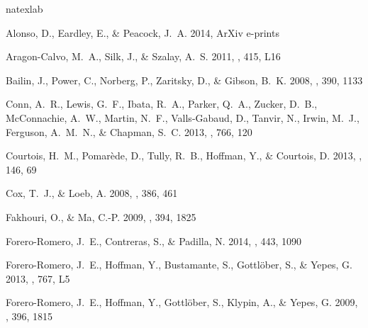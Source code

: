 \documentclass{emulateapj}
\begin{document}
\begin{thebibliography}{38}
\expandafter\ifx\csname natexlab\endcsname\relax\def\natexlab#1{#1}\fi

{Alonso}, D., {Eardley}, E., \& {Peacock}, J.~A. 2014, ArXiv e-prints

{Aragon-Calvo}, M.~A., {Silk}, J., \& {Szalay}, A.~S. 2011, \mnras, 415, L16

{Bailin}, J., {Power}, C., {Norberg}, P., {Zaritsky}, D., \& {Gibson}, B.~K.
  2008, \mnras, 390, 1133

{Conn}, A.~R., {Lewis}, G.~F., {Ibata}, R.~A., {Parker}, Q.~A., {Zucker},
  D.~B., {McConnachie}, A.~W., {Martin}, N.~F., {Valls-Gabaud}, D., {Tanvir},
  N., {Irwin}, M.~J., {Ferguson}, A.~M.~N., \& {Chapman}, S.~C. 2013, \apj,
  766, 120

{Courtois}, H.~M., {Pomar{\`e}de}, D., {Tully}, R.~B., {Hoffman}, Y., \&
  {Courtois}, D. 2013, \aj, 146, 69

{Cox}, T.~J., \& {Loeb}, A. 2008, \mnras, 386, 461

{Fakhouri}, O., \& {Ma}, C.-P. 2009, \mnras, 394, 1825

{Forero-Romero}, J.~E., {Contreras}, S., \& {Padilla}, N. 2014, \mnras, 443,
  1090

{Forero-Romero}, J.~E., {Hoffman}, Y., {Bustamante}, S., {Gottl{\"o}ber}, S.,
  \& {Yepes}, G. 2013, \apjl, 767, L5

{Forero-Romero}, J.~E., {Hoffman}, Y., {Gottl{\"o}ber}, S., {Klypin}, A., \&
  {Yepes}, G. 2009, \mnras, 396, 1815


\end{thebibliography}
\end{document}
